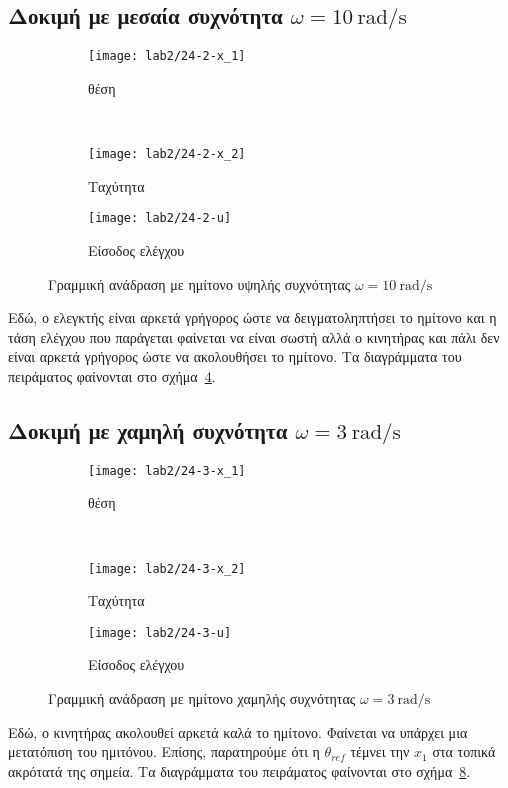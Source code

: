 \subsection[Δοκιμή με μεσαία συχνότητα]{Δοκιμή με μεσαία συχνότητα $\omega = \SI{10}{\radian / \second}$}
\begin{figure}[htbp]
  \centering
  \begin{subfigure}[t]{\linewidth}
    \texttt{[image: lab2/24-2-x\_1]}
    \caption{θέση}
    \label{fig:24-2-x_1}
  \end{subfigure}\\
  \begin{subfigure}[t]{0.45\linewidth}
    \texttt{[image: lab2/24-2-x\_2]}
    \caption{Ταχύτητα}
    \label{fig:24-2-x_2}
  \end{subfigure}\hfill
  \begin{subfigure}[t]{0.45\linewidth}
    \texttt{[image: lab2/24-2-u]}
    \caption{Είσοδος ελέγχου}
    \label{fig:24-2-u}
  \end{subfigure}
  \caption[Γραμμική ανάδραση με ημίτονο μεσαίας συχνότητας]{Γραμμική ανάδραση με ημίτονο υψηλής συχνότητας $\omega = \SI{10}{\radian / \second}$}
  \label{fig:24-2}
\end{figure}
Εδώ, ο ελεγκτής είναι αρκετά γρήγορος ώστε να δειγματοληπτήσει το ημίτονο και η τάση ελέγχου που παράγεται φαίνεται να
είναι σωστή αλλά ο κινητήρας και πάλι δεν είναι αρκετά γρήγορος ώστε να ακολουθήσει το ημίτονο.
Τα διαγράμματα του πειράματος φαίνονται στο σχήμα~\ref{fig:24-2}.

\subsection[Δοκιμή με χαμηλή συχνότητα]{Δοκιμή με χαμηλή συχνότητα $\omega = \SI{3}{\radian / \second}$}
\begin{figure}[htbp]
  \centering
  \begin{subfigure}[t]{\linewidth}
    \texttt{[image: lab2/24-3-x\_1]}
    \caption{θέση}
    \label{fig:24-3-x_1}
  \end{subfigure}\\
  \begin{subfigure}[t]{0.45\linewidth}
    \texttt{[image: lab2/24-3-x\_2]}
    \caption{Ταχύτητα}
    \label{fig:24-3-x_2}
  \end{subfigure}\hfill
  \begin{subfigure}[t]{0.45\linewidth}
    \texttt{[image: lab2/24-3-u]}
    \caption{Είσοδος ελέγχου}
    \label{fig:24-3-u}
  \end{subfigure}
  \caption[Γραμμική ανάδραση με ημίτονο χαμηλής συχνότητας]{Γραμμική ανάδραση με ημίτονο χαμηλής συχνότητας $\omega = \SI{3}{\radian / \second}$}
  \label{fig:24-3}
\end{figure}
Εδώ, ο κινητήρας ακολουθεί αρκετά καλά το ημίτονο. Φαίνεται να υπάρχει μια μετατόπιση του ημιτόνου. Επίσης, παρατηρούμε
ότι η $\theta_{ref}$ τέμνει την $x_1$ στα τοπικά ακρότατά της σημεία.
Τα διαγράμματα του πειράματος φαίνονται στο σχήμα~\ref{fig:24-3}.

